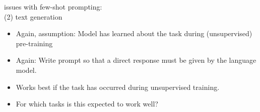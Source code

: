 \begin{frame}{issues with few-shot prompting:\\ (2) text generation}

\vfill

\begin{itemize}
    \item Again, assumption: Model has learned about the task during (unsupervised) pre-training 
    \item Again: Write prompt so that  a direct response must be
    given by the language model.
\item Works best if the task has occurred during
unsupervised training.
    \item \ques For which tasks is this expected to work well?
\end{itemize}

\vfill

\end{frame}




%
%
%
%
%

%
%
%
%
%


